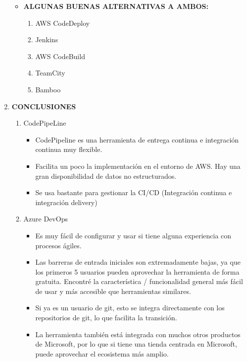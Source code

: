 \documentclass[12pt,a4paper,oneside]{book}
\begin{document}
\begin{enumerate}
\begin{itemize}
				\item \textbf{ALGUNAS BUENAS ALTERNATIVAS A AMBOS:}
						\begin{enumerate}
							\item AWS CodeDeploy
							\item Jenkins
							\item AWS CodeBuild
							\item TeamCity
							\item Bamboo
						\end{enumerate}
			\end{itemize}
		\item \textbf{CONCLUSIONES}
				\begin{enumerate}
					\item CodePipeLine
						\begin{itemize}
							\item CodePipeline es una herramienta de entrega continua e integración continua muy flexible.
							\item Facilita un poco la implementación en el entorno de AWS. Hay una gran disponibilidad de datos no estructurados.
							\item Se usa bastante para gestionar la CI/CD (Integración continua e integración delivery)
							
						\end{itemize}
					\item Azure DevOps
						\begin{itemize}
							\item Es muy fácil de configurar y usar si tiene alguna experiencia con procesos ágiles. 
							\item Las barreras de entrada iniciales son extremadamente bajas, ya que los primeros 5 usuarios pueden aprovechar la herramienta de forma gratuita. Encontré la característica / funcionalidad general más fácil de usar y más accesible que herramientas similares. 
							\item Si ya es un usuario de git, esto se integra directamente con los repositorios de git, lo que facilita la transición. 
							\item La herramienta también está integrada con muchos otros productos de Microsoft, por lo que si tiene una tienda centrada en Microsoft, puede aprovechar el ecosistema más amplio.
							
							
						\end{itemize}
				\end{enumerate}
				

\end{enumerate}
\end{document}
